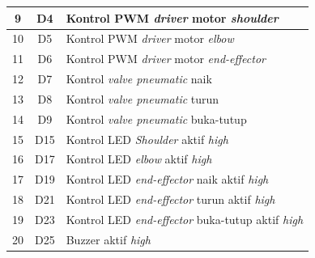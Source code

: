 \begin{longtable}{|c|c|l|}
	9                         & D4                                 & Kontrol PWM \textit{driver} motor \textit{shoulder}                                          \\ \hline
	10                        & D5                                 & Kontrol PWM \textit{driver} motor \textit{elbow}                                             \\ \hline
	11                        & D6                                 & Kontrol PWM \textit{driver} motor \textit{end-effector}                                      \\ \hline
	12                        & D7                                 & Kontrol \textit{valve pneumatic} naik                                                   \\ \hline
	13                        & D8                                 & Kontrol \textit{valve pneumatic} turun                                                  \\ \hline
	14                        & D9                                 & Kontrol \textit{valve pneumatic} buka-tutup                                             \\ \hline
	15                        & D15                                & Kontrol LED \textit{Shoulder} aktif \textit{high}                                            \\ \hline
	16                        & D17                                & Kontrol LED \textit{elbow} aktif \textit{high}                                               \\ \hline
	17                        & D19                                & Kontrol LED \textit{end-effector} naik aktif \textit{high}                                   \\ \hline
	18                        & D21                                & Kontrol LED \textit{end-effector} turun aktif \textit{high}                                  \\ \hline
	19                        & D23                                & Kontrol LED \textit{end-effector} buka-tutup aktif \textit{high}                             \\ \hline
	20                        & D25                                & Buzzer aktif \textit{high}                                                          \\ \hline
\end{longtable}

